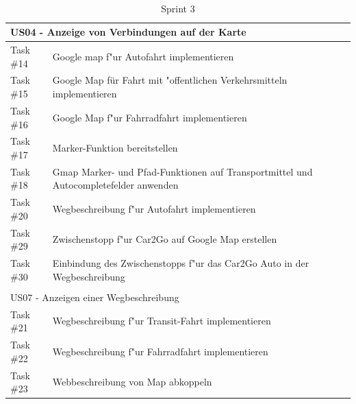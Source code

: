 \documentclass[a4paper, 11pt]{scrreprt}
\begin{document}
\begin{table}[H]

\caption{Sprint 3}

\ \\

\par

\label{tab:Sprint 3}

\centering

\begin{tabular}{|p{2.5cm} p{12cm}| ll}

\hline
\multicolumn{2}{|l|}{US04 - Anzeige von Verbindungen auf der Karte} \\

\hline
Task \#14 & Google map f"ur Autofahrt implementieren\\

\hline
Task \#15 & Google Map für Fahrt mit "offentlichen Verkehrsmitteln implementieren\\

\hline
Task \#16 & Google Map f"ur Fahrradfahrt implementieren\\

\hline
Task \#17 & Marker-Funktion bereitstellen\\

\hline
Task \#18 & Gmap Marker- und Pfad-Funktionen auf Transportmittel und Autocompletefelder anwenden\\

\hline
Task \#20 & Wegbeschreibung f"ur Autofahrt implementieren\\

\hline
Task \#29 & Zwischenstopp f"ur Car2Go auf Google Map erstellen\\

\hline
Task \#30 & Einbindung des Zwischenstopps f"ur das Car2Go Auto in der Wegbeschreibung\\

\hline
\multicolumn{2}{l}{}\\

\hline
\multicolumn{2}{|l|}{US07 - Anzeigen einer Wegbeschreibung}\\

\hline
Task \#21 & Wegbeschreibung f"ur Transit-Fahrt implementieren\\

\hline
Task \#22 & Wegbeschreibung f"ur Fahrradfahrt implementieren\\

\hline
Task \#23 & Webbeschreibung von Map abkoppeln\\

\hline
\end{tabular}

\end{table}
\end{document}
